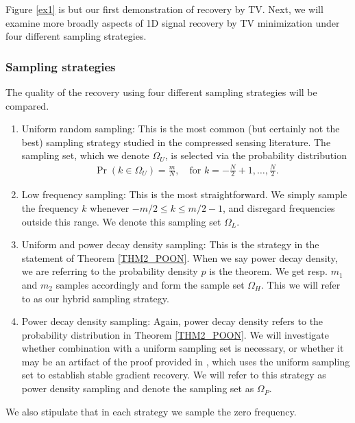 \documentclass[11pt, oneside]{article}   %
\DeclareMathOperator*{\prob}{Pr}
\begin{document}
Figure \ref{ex1} is but our first demonstration of recovery by TV. Next, we will examine more broadly aspects of 1D signal recovery by TV minimization under four different sampling strategies.

\subsubsection{Sampling strategies}\label{sampling strategies}
The quality of the recovery using four different sampling strategies will be compared.
\begin{enumerate}
        \item Uniform random sampling: This is the most common (but certainly not the best) sampling strategy studied in the compressed sensing literature. The sampling set, which we denote $\Omega_U$, is selected via the probability distribution 
\begin{align*}
        \prob(k \in \Omega_U) = \frac{m}{N}, \quad \text{for }k = -\frac{N}{2}+1, \dots, \frac{N}{2}.
\end{align*}

\item Low frequency sampling: This is the most straightforward. We simply sample the frequency $k$ whenever $-m/2 \leq k \leq m/2-1$, and disregard frequencies outside this range. We denote this sampling set $\Omega_L$.


\item Uniform and power decay density sampling:  This is the strategy in the statement of Theorem \ref{THM2_POON}. When we say power decay density, we are referring to the probability density $p$ is the theorem. We get resp. $m_1$ and $m_2$ samples accordingly and form the sample set $\Omega_H$. This we will refer to as our hybrid sampling strategy.

\item Power decay density sampling: Again, power decay density refers to the probability distribution in Theorem \ref{THM2_POON}. We will investigate whether combination with a uniform sampling set is necessary, or whether it may be an artifact of the proof provided in \cite{poon2015tv}, which uses the uniform sampling set to establish stable gradient recovery. We will refer to this strategy as power density sampling and denote the sampling set as $\Omega_P$.
\end{enumerate}
We also stipulate that in each strategy we sample the zero frequency.
 
\end{document}
